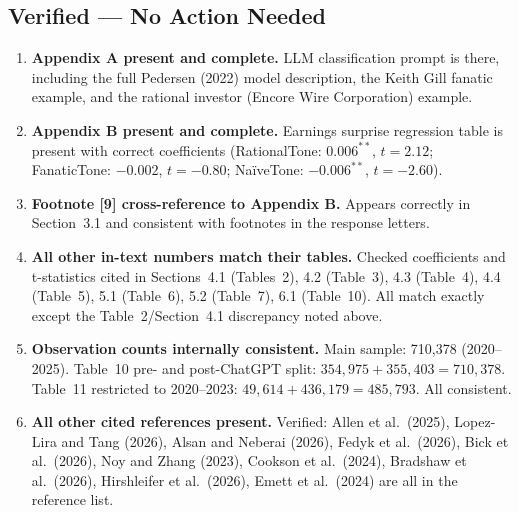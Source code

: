 \documentclass[11pt]{article}
\newcommand{\done}{\textcolor{done}{$\checkmark$}}
\begin{document}
\subsection{Verified --- No Action Needed}

\begin{enumerate}[leftmargin=*, label=\done]

  \item \textbf{Appendix A present and complete.} LLM classification
    prompt is there, including the full Pedersen (2022) model
    description, the Keith Gill fanatic example, and the rational
    investor (Encore Wire Corporation) example.

  \item \textbf{Appendix B present and complete.} Earnings surprise
    regression table is present with correct coefficients
    (RationalTone: $0.006^{**}$, $t=2.12$; FanaticTone: $-0.002$,
    $t=-0.80$; Na\"{i}veTone: $-0.006^{**}$, $t=-2.60$).

  \item \textbf{Footnote [9] cross-reference to Appendix B.}
    Appears correctly in Section~3.1 and consistent with footnotes
    in the response letters.

  \item \textbf{All other in-text numbers match their tables.}
    Checked coefficients and t-statistics cited in Sections~4.1
    (Tables~2), 4.2 (Table~3), 4.3 (Table~4), 4.4 (Table~5), 5.1
    (Table~6), 5.2 (Table~7), 6.1 (Table~10). All match exactly
    except the Table~2/Section~4.1 discrepancy noted above.

  \item \textbf{Observation counts internally consistent.}
    Main sample: 710,378 (2020--2025). Table~10 pre- and
    post-ChatGPT split: $354{,}975 + 355{,}403 = 710{,}378$. Table~11
    restricted to 2020--2023: $49{,}614 + 436{,}179 = 485{,}793$.
    All consistent.

  \item \textbf{All other cited references present.} Verified: Allen
    et al.\ (2025), Lopez-Lira and Tang (2026), Alsan and Neberai
    (2026), Fedyk et al.\ (2026), Bick et al.\ (2026), Noy and Zhang
    (2023), Cookson et al.\ (2024), Bradshaw et al.\ (2026),
    Hirshleifer et al.\ (2026), Emett et al.\ (2024) are all in the
    reference list.

\end{enumerate}

\newpage
\end{document}
